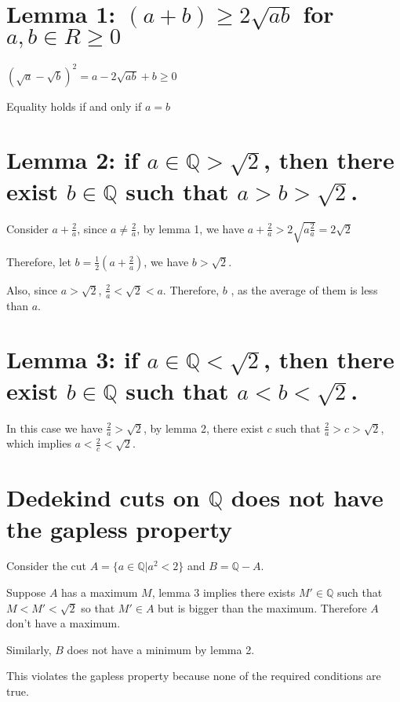 \section*{Lemma 1: $(a + b) \ge 2\sqrt{ab}$ for $a, b \in R \ge 0$}

$ (\sqrt{a} - \sqrt{b})^2 = a - 2\sqrt{ab} + b \ge 0 $

Equality holds if and only if $ a = b $

\section*{Lemma 2: if $ a \in \mathbb{Q} > \sqrt{2} $, then there exist $ b \in \mathbb{Q} $ such that $ a > b > \sqrt{2} $.}

Consider $ a + \frac{2}{a} $, since $ a \ne \frac{2}{a} $, by lemma 1, we have $ a + \frac{2}{a} > 2\sqrt{a\frac{2}{a}} = 2 \sqrt{2}$

Therefore, let $ b = \frac{1}{2}\left(a + \frac{2}{a}\right) $, we have $ b > \sqrt{2} $.

Also, since $ a > \sqrt{2} $, $ \frac{2}{a} < \sqrt{2} < a$. Therefore, $ b $ , as the average of them is less than $ a $.

\section*{Lemma 3: if $ a \in \mathbb{Q} < \sqrt{2} $, then there exist $ b \in \mathbb{Q} $ such that $ a < b < \sqrt{2} $.}

In this case we have $ \frac{2}{a} > \sqrt{2} $, by lemma 2, there exist $ c $ such that $ \frac{2}{a} > c > \sqrt{2} $, which implies $ a < \frac{2}{c} < \sqrt{2} $.

\section*{Dedekind cuts on $\mathbb{Q} $ does not have the gapless property}

Consider the cut $ A = \{ a \in \mathbb{Q} | a^2 < 2\} $ and $ B = \mathbb{Q} - A $. 

Suppose $ A $ has a maximum $ M $, lemma 3 implies there exists $ M' \in \mathbb{Q} $ such that $ M < M' < \sqrt{2} $ so that $ M' \in A $ but is bigger than the maximum. Therefore $ A $ don't have a maximum.

Similarly, $ B $ does not have a minimum by lemma 2.

This violates the gapless property because none of the required conditions are true.


